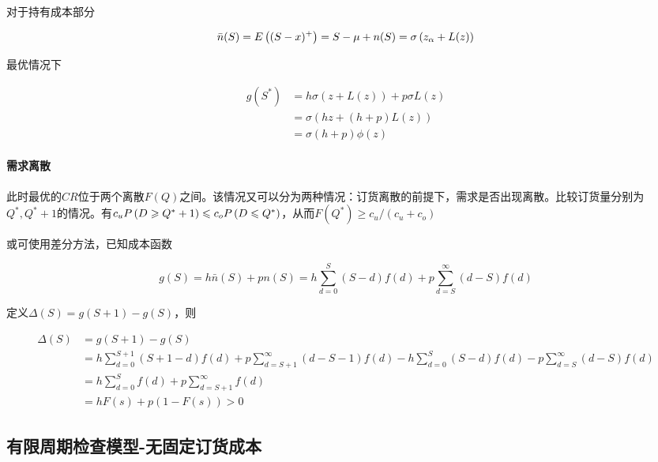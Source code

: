 \documentclass{../notes}
\begin{document}
    对于持有成本部分

    \begin{equation*}
        \bar n(S) = E\left((S-x)^+\right) = S-\mu+n(S) = \sigma \left(z_\alpha + L(z)\right)
    \end{equation*}

    最优情况下

    \begin{equation}
        \begin{aligned}
            g\left(S^*\right) &= h\sigma \left(z+ L(z)\right) + p\sigma L(z) \\
            &= \sigma\left(hz + (h + p)L(z)\right) \\
            &= \sigma(h + p)\phi(z)
        \end{aligned}
    \end{equation}

    \separate[0.5pt]

    \paragraph*{需求离散} 此时最优的$CR$位于两个离散$F(Q)$之间。该情况又可以分为两种情况：订货离散的前提下，需求是否出现离散。比较订货量分别为$Q^*, Q^*+1$的情况。有$c_uP\left(D\geqslant Q^*+1\right)\leqslant c_oP\left(D\leqslant Q^*\right)$，从而$F(Q^*)\geq c_u/(c_u+c_o)$

    或可使用差分方法，已知成本函数

    \begin{equation}
        g(S) = h\bar n(S) + pn(S) = h\sum_{d=0}^S (S-d)f(d) + p\sum_{d=S}^\infty (d-S)f(d)
    \end{equation}

    定义$\Delta(S) = g(S+1) - g(S)$，则

    \begin{equation*}
        \begin{aligned}
            \Delta(S) &= g(S+1) - g(S) \\
            &=h\sum_{d=0}^{S+1} (S + 1 - d)f(d) + p\sum_{d=S+1}^\infty (d- S - 1)f(d) - h\sum_{d=0}^S (S-d)f(d) - p\sum_{d=S}^\infty (d-S)f(d) \\
            &= h\sum_{d=0}^Sf(d) + p\sum_{d=S + 1}^\infty f(d) \\
            &= hF(s) + p(1-F(s)) > 0
        \end{aligned}
    \end{equation*}

    \subsection*{有限周期检查模型-无固定订货成本}
\end{document}
